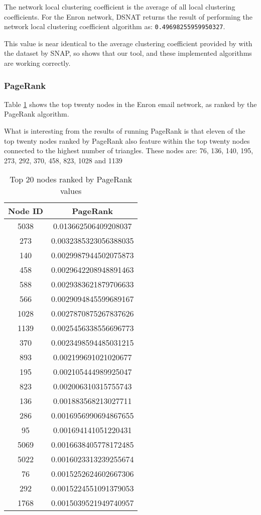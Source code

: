 The network local clustering coefficient is the average of all local clustering coefficients. For the Enron network, DSNAT returns the result of performing the network local clustering coefficient algorithm as: {\tt 0.49698255959950327}.

This value is near identical to the average clustering coefficient provided by with the dataset by SNAP, so shows that our tool, and these implemented algorithms are working correctly.

\subsubsection{PageRank}
Table \ref{tab:enronpagerank} shows the top twenty nodes in the Enron email network, as ranked by the PageRank algorithm.

What is interesting from the results of running PageRank is that eleven of the top twenty nodes ranked by PageRank also feature within the top twenty nodes connected to the highest number of triangles. These nodes are: 76, 136, 140, 195, 273, 292, 370, 458, 823, 1028 and 1139

\begin{table}%
\centering
\begin{tabular}{|c|c|}
\hline
Node ID & PageRank \\
\hline
5038 & 0.013662506409208037 \\
273 & 0.0032385323056388035 \\
140 & 0.0029987944502075873 \\
458 & 0.0029642208948891463 \\
588 & 0.0029383621879706633 \\
566 & 0.0029094845599689167 \\
1028 & 0.0027870875267837626 \\
1139 & 0.0025456338556696773 \\
370 & 0.0023498594485031215 \\
893 & 0.002199691021020677 \\
195 & 0.002105444989925047 \\
823 & 0.002006310315755743 \\
136 & 0.001883568213027711 \\
286 & 0.0016956990694867655 \\
95 & 0.001694141051220431 \\
5069 & 0.0016638405778172485 \\
5022 & 0.0016023313239255674 \\
76 & 0.0015252624602667306 \\
292 & 0.0015224551091379053 \\
1768 & 0.0015039521949740957 \\
\hline
\end{tabular}
\caption{Top 20 nodes ranked by PageRank values}
\label{tab:enronpagerank}
\end{table}

